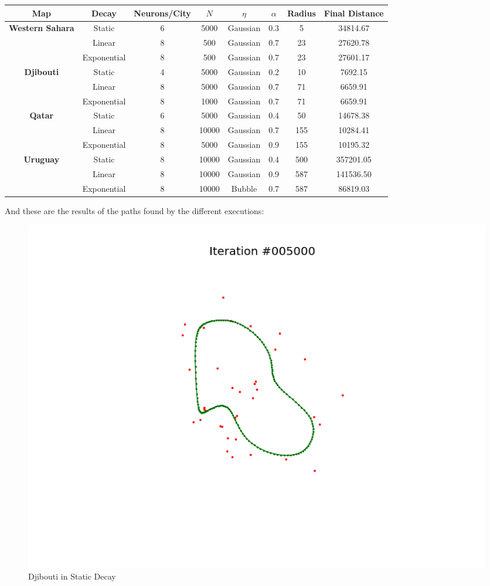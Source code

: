 \documentclass[11pt]{article}
\begin{document}
\begin{table}[ht]
  \begin{center}
    \begin{tabular}{| c | c | c | c | c | c | c | c |}
      \hline
      Map & Decay & Neurons/City & $N$
      & $\eta$ & $\alpha$ & Radius & Final Distance\\
      \hline
      \hline
      \multirow{3}{*}{\textbf{Western Sahara}}
        & Static & 6 & 5000 & Gaussian & 0.3 & 5 & 34814.67 \\
        & Linear & 8 & 500 & Gaussian & 0.7 & 23 & 27620.78 \\
        & Exponential & 8 & 500 & Gaussian & 0.7 & 23 & 27601.17 \\
      \hline
      \multirow{3}{*}{\textbf{Djibouti}}
        & Static & 4 & 5000 & Gaussian & 0.2 & 10 & 7692.15\\
        & Linear & 8 & 5000 & Gaussian & 0.7 & 71 & 6659.91 \\
        & Exponential & 8 & 1000 & Gaussian & 0.7 & 71 & 6659.91 \\
      \hline
      \multirow{3}{*}{\textbf{Qatar}}
        & Static & 6 & 5000 & Gaussian & 0.4 & 50 & 14678.38 \\
        & Linear & 8 & 10000 & Gaussian & 0.7 & 155 &10284.41 \\
        & Exponential & 8 & 5000 & Gaussian & 0.9 & 155 & 10195.32 \\
      \hline
      \multirow{3}{*}{\textbf{Uruguay}}
        & Static & 8 & 10000 & Gaussian & 0.4 & 500 & 357201.05 \\
        & Linear & 8 & 10000 & Gaussian & 0.9 & 587 & 141536.50 \\
        & Exponential & 8 & 10000 & Bubble & 0.7 & 587 & 86819.03 \\
      \hline
    \end{tabular}
  \end{center}
\end{table}

And these are the results of the paths found by the different executions:

\begin{figure}[!ht]
  \centering
  \includegraphics[scale=0.6]{d_s.png}
  \caption{Djibouti in Static Decay}
\end{figure}
\end{document}
